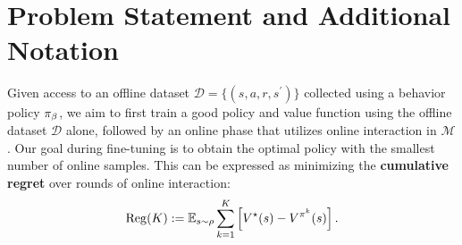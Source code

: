 \vspace{-0.2cm}
\section{Problem Statement and Additional Notation}
\vspace{-0.15cm}

Given access to an offline dataset $\mathcal{D} = \{(s, a, r, s^\prime)\}$ collected using a behavior policy ${\pi_\beta}$, we aim to first train a good policy and value function using the offline dataset $\mathcal{D}$ alone, followed by an online phase that utilizes online interaction in $\mathcal{M}$. Our goal during fine-tuning is to obtain the optimal policy with the smallest number of online samples. This can be expressed as minimizing the \textbf{cumulative regret} over rounds of online interaction: 
\begin{align}
\mathrm{Reg}(K) := \mathbb E_{s\sim \rho}\sum_{k=1}^K\left[ V^{\star}(s) - V^{\pi^k}(s) \right]. 
\end{align}

